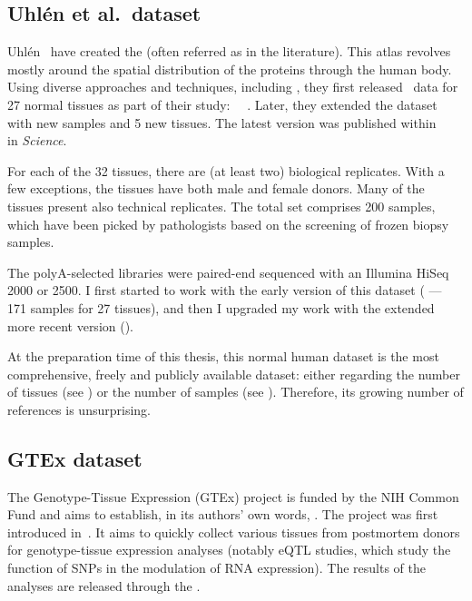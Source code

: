 \subsection{Uhlén et al.\ dataset}\label{subsec:uhlenPresentation}
\vspace*{-0.1in}
Uhlén \etal\ have created the
(often referred as  in the literature).
This atlas revolves mostly around the spatial
distribution of the proteins through the human body.
Using diverse approaches and techniques, including \Rnaseq,
they first released \Rnaseq\ data for 27 normal tissues
as part of their study:~%
~.
Later, they extended the dataset with new samples and 5 new
tissues. The latest version was published within~%
~ in \textit{Science}.\mybr\

For each of the 32 tissues, there are (at least two) biological replicates.
With a few exceptions, the tissues have both male and female donors.
Many of the tissues present also technical replicates.
The total set comprises 200 samples,
which have been picked by pathologists
based on the screening of frozen biopsy samples.\mybr\

The polyA-selected libraries were paired-end sequenced
with an Illumina HiSeq 2000 or 2500.
I first started to work with the early version of this dataset
( --- 171 samples for 27 tissues),
and then I upgraded my work with the extended more recent version
().\mybr\

At the preparation time of this thesis, this normal human dataset is the
most comprehensive, freely and publicly available dataset:
either regarding the number of tissues (see )
or the number of samples (see ).
Therefore, its growing number of references is unsurprising.\mybr\

\subsection{GTEx dataset}\label{subsec:gtexPresentation}
\vspace*{-0.1in}
The Genotype-Tissue Expression (\gls{GTEx}) project is funded by the \gls{NIH}
Common Fund and aims to establish, in its authors' own words,
.
The project was first introduced in~\citet{GTEx2013}. It aims to quickly collect
various tissues from postmortem donors for genotype-tissue expression analyses
(notably \gls{eQTL} studies, which study the function of \glspl{SNP}
in the modulation of \gls{RNA} expression).
The results of the
analyses are released through the .\mybr\

